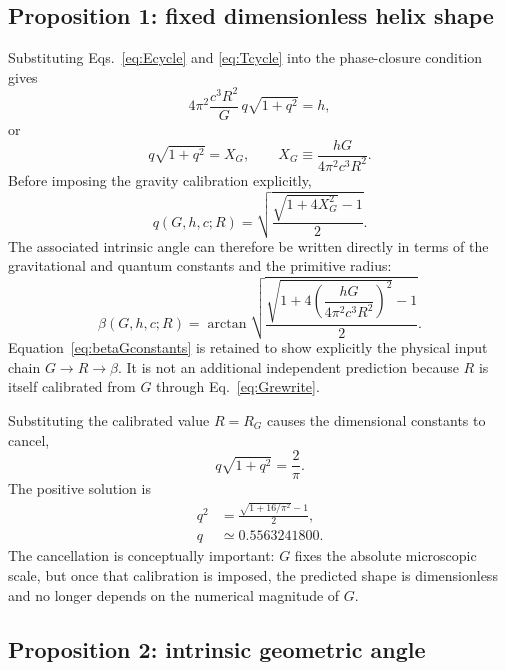 \documentclass[aps,prd,reprint,nofootinbib,floatfix]{revtex4-2}
\begin{document}
\subsection{Proposition 1: fixed dimensionless helix shape}

Substituting Eqs.~\eqref{eq:Ecycle} and \eqref{eq:Tcycle} into the phase-closure condition gives
\begin{equation}
4\pi^2\frac{c^3R^2}{G}\,q\sqrt{1+q^2}=h,
\label{eq:dimq}
\end{equation}
or
\begin{equation}
q\sqrt{1+q^2}=X_G,
\qquad
X_G\equiv\frac{hG}{4\pi^2c^3R^2}.
\label{eq:XG}
\end{equation}
Before imposing the gravity calibration explicitly,
\begin{equation}
q(G,h,c;R)=
\sqrt{\frac{\sqrt{1+4X_G^2}-1}{2}}.
\label{eq:qdimensional}
\end{equation}
The associated intrinsic angle can therefore be written directly in terms of the gravitational and quantum constants and the primitive radius:
\begin{equation}
\boxed{
\beta(G,h,c;R)=
\arctan\!\sqrt{
\frac{\sqrt{1+4\left(\dfrac{hG}{4\pi^2c^3R^2}\right)^2}-1}{2}}
}.
\label{eq:betaGconstants}
\end{equation}
Equation~\eqref{eq:betaGconstants} is retained to show explicitly the physical input chain $G\rightarrow R\rightarrow\beta$.  It is not an additional independent prediction because $R$ is itself calibrated from $G$ through Eq.~\eqref{eq:Grewrite}.

Substituting the calibrated value $R=R_G$ causes the dimensional constants to cancel,
\begin{equation}
\boxed{q\sqrt{1+q^2}=\frac{2}{\pi}}.
\label{eq:qeq}
\end{equation}
The positive solution is
\begin{align}
q^2 &= \frac{\sqrt{1+16/\pi^2}-1}{2},\\
q &\simeq 0.5563241800.
\label{eq:qnum}
\end{align}
The cancellation is conceptually important: $G$ fixes the absolute microscopic scale, but once that calibration is imposed, the predicted shape is dimensionless and no longer depends on the numerical magnitude of $G$.

\subsection{Proposition 2: intrinsic geometric angle}
\end{document}
